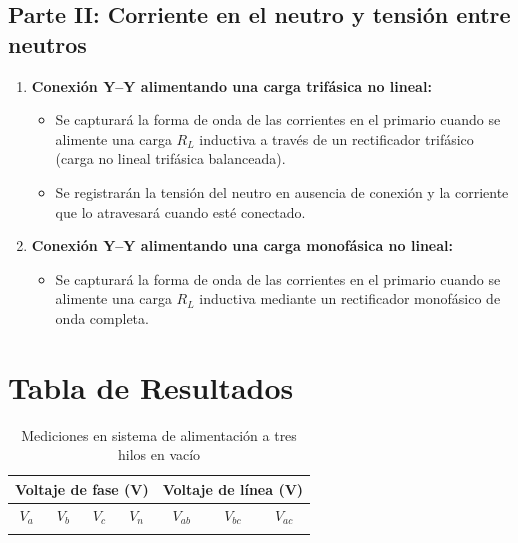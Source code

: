 \documentclass[12pt]{article}
\begin{document}
\subsection{Parte II: Corriente en el neutro y tensi\'on entre neutros}

\begin{enumerate}
    \item \textbf{Conexi\'on Y--Y alimentando una carga trif\'asica no lineal:}
    \begin{itemize}
        \item Se capturar\'a la forma de onda de las corrientes en el primario cuando se alimente una carga $R_L$ inductiva a trav\'es de un rectificador trif\'asico (carga no lineal trif\'asica balanceada).
        \item Se registrar\'an la tensi\'on del neutro en ausencia de conexi\'on y la corriente que lo atravesar\'a cuando est\'e conectado.
    \end{itemize}
    \item \textbf{Conexi\'on Y--Y alimentando una carga monof\'asica no lineal:}
    \begin{itemize}
        \item Se capturar\'a la forma de onda de las corrientes en el primario cuando se alimente una carga $R_L$ inductiva mediante un rectificador monof\'asico de onda completa.
    \end{itemize}
\end{enumerate}
\newpage

\section{Tabla de Resultados}

\renewcommand{\tablename}{Cuadro}
\setcounter{table}{0}

\begin{table}[H]
\centering
\small
\setlength{\tabcolsep}{4pt}
\caption{Mediciones en sistema de alimentaci\'on a tres hilos en vac\'io}
\begin{tabular}{|c|c|c|c|c|c|c|}
\hline
\multicolumn{4}{|c|}{Voltaje de fase (V)} & \multicolumn{3}{c|}{Voltaje de l\'inea (V)} \\ \hline
$V_a$ & $V_b$ & $V_c$ & $V_n$ & $V_{ab}$ & $V_{bc}$ & $V_{ac}$ \\ \hline
 & & & & & & \\ \hline
\end{tabular}
\end{table}
\end{document}
